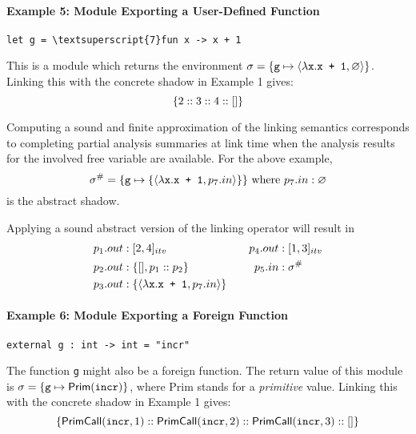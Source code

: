 \documentclass{article}
\begin{document}
\paragraph{Example 5: Module Exporting a User-Defined Function}
\begin{center}
  \begin{BVerbatim}[commandchars=\\\{\}]
let g = \textsuperscript{7}fun x -> x + 1
  \end{BVerbatim}
\end{center}
This is a module which returns the environment
$\sigma=\{\texttt{g}\mapsto\langle\lambda\texttt{x}.\texttt{x + 1},\varnothing\rangle\}$.
Linking this with the concrete shadow in Example 1 gives:
\[\{2::3::4::[]\}\]

Computing a sound and finite approximation of the linking semantics
corresponds to completing partial analysis summaries at link time when
the analysis results for the involved free variable are available. For
the above example,
\[
  {\sigma}^{\#}=\{\texttt{g}\mapsto\{\langle\lambda\texttt{x}.\texttt{x + 1},p_7.{in}\rangle\}\}\text{ where }
  p_7.{in}:\varnothing
\]
is the abstract shadow.

Applying a sound abstract version of the linking operator will result in
\begin{align*}
  p_1.{out} & :[2,4]_{{itv}}                                                     &  &  & p_4.{out} & :[1,3]_{{itv}} \\
  p_2.{out} & :\{[],p_1:: p_2\}                                            &  &  & p_5.{in}  & :{\sigma}^{\#}               \\
  p_3.{out} & :\{\langle\lambda\texttt{x}.\texttt{x + 1},p_7.{in}\rangle\} &  &  &
\end{align*}

\paragraph{Example 6: Module Exporting a Foreign Function}
\begin{center}
  \begin{BVerbatim}
external g : int -> int = "incr"
  \end{BVerbatim}
\end{center}
The function \texttt{g} might also be a foreign function.
The return value of this module is
$\sigma=\{\texttt{g}\mapsto\textsf{Prim}(\texttt{incr})\}$,
where \textsf{Prim} stands for a \emph{primitive} value.
Linking this with the concrete shadow in Example 1 gives:
\[\{\textsf{PrimCall}(\texttt{incr},1)::\textsf{PrimCall}(\texttt{incr},2)::\textsf{PrimCall}(\texttt{incr},3)::[]\}\]
\end{document}
